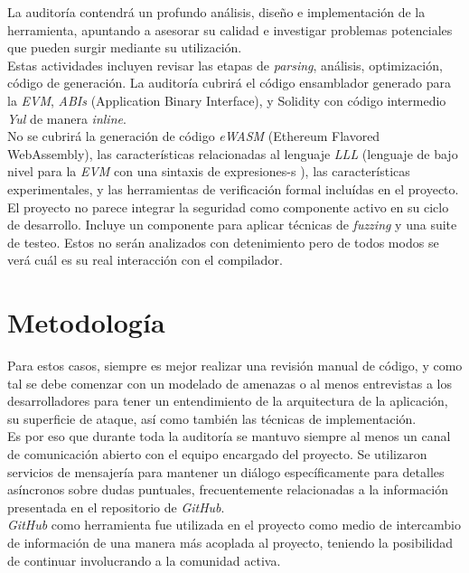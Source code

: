 La auditoría contendrá un profundo análisis, diseño e implementación de la herramienta, apuntando a asesorar su calidad e investigar problemas potenciales que pueden surgir mediante su utilización.\\

Estas actividades incluyen revisar las etapas de \textit{parsing}, análisis, optimización, código de generación. La auditoría cubrirá el código ensamblador generado para la \textit{EVM}, \textit{ABIs} (Application Binary Interface), y Solidity con código intermedio \textit{Yul} de manera \textit{inline}.\\

No se cubrirá la generación de código \textit{eWASM} (Ethereum Flavored WebAssembly), las características relacionadas al lenguaje \textit{LLL} (lenguaje de bajo nivel para la \textit{EVM} con una sintaxis de expresiones-s ), las características experimentales, y las herramientas de verificación formal incluídas en el proyecto.\\

El proyecto no parece integrar la seguridad como componente activo en su ciclo de desarrollo. Incluye un componente para aplicar técnicas de \textit{fuzzing} y una suite de testeo. Estos no serán analizados con detenimiento pero de todos modos se verá cuál es su real interacción con el compilador.

\section{Metodología }
\label{chap:metodo:metodologia}
Para estos casos, siempre es mejor realizar una revisión manual de código, y como tal se debe comenzar con un modelado de amenazas o al menos entrevistas a los desarrolladores para tener un entendimiento de la arquitectura de la aplicación, su superficie de ataque, así como también las técnicas de implementación.\\

Es por eso que durante toda la auditoría se mantuvo siempre al menos un canal de comunicación abierto con el equipo encargado del proyecto. Se utilizaron servicios de mensajería\cite{GitterLink} para mantener un diálogo específicamente para detalles asíncronos sobre dudas puntuales, frecuentemente relacionadas a la información presentada en el repositorio de \textit{GitHub}.\\

\textit{GitHub} como herramienta fue utilizada en el proyecto como medio de intercambio de información de una manera más acoplada al proyecto, teniendo la posibilidad de continuar involucrando a la comunidad activa.\\

